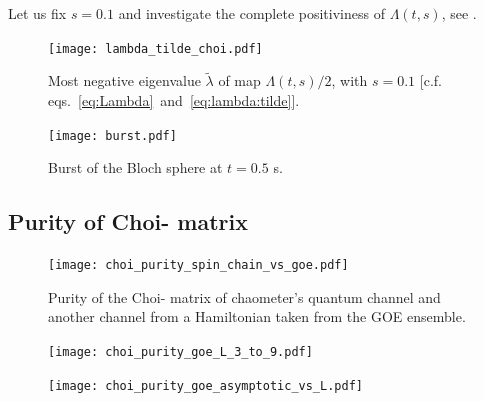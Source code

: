 Let us fix $s=0.1$ and investigate the complete positiviness of 
$\Lambda(t, s)$, see .

\begin{figure}
\centering
\texttt{[image: lambda\_tilde\_choi.pdf]}
\caption{Most negative eigenvalue $\tilde \lambda$ of map $\Lambda(t,s)/2$, 
with $s=0.1$ [c.f. eqs.~\eqref{eq:Lambda}~and~\eqref{eq:lambda:tilde}].}
\label{fig:lambda:tilde:Choi-\jami{}}
\end{figure}

\begin{figure}
\centering
\texttt{[image: burst.pdf]}
\caption{Burst of the Bloch sphere at $t=0.5$ s.}
\label{fig:burst}
\end{figure}

\subsection{Purity of Choi-\jami{} matrix}
\begin{figure}
\centering
\texttt{[image: choi\_purity\_spin\_chain\_vs\_goe.pdf]}
\caption{Purity of the Choi-\jami{} matrix of chaometer's quantum channel and 
another channel from a Hamiltonian taken from the GOE ensemble.}
\label{fig:choi:purity:spin:chain:vs:goe}
\end{figure}


\begin{figure}
\centering
\texttt{[image: choi\_purity\_goe\_L\_3\_to\_9.pdf]}
\caption{
}
\end{figure}
\begin{figure}
\centering
\texttt{[image: choi\_purity\_goe\_asymptotic\_vs\_L.pdf]}
\caption{
}
\end{figure}
